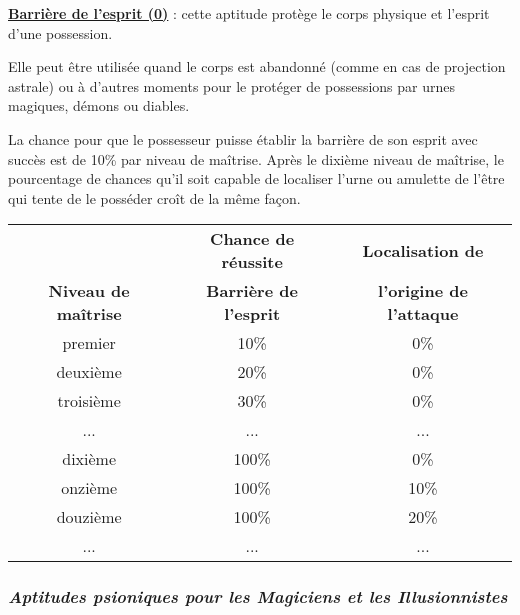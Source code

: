 \bigskip

\label{guerrier-barriere-esprit}\textbf{\uline{Barrière de l'esprit (0)}} : cette aptitude protège le corps physique et l'esprit d'une possession.

\bigskip

Elle peut être utilisée quand le corps est abandonné (comme en cas de projection astrale) ou à d'autres moments pour le protéger de possessions par urnes magiques, démons ou diables.

\bigskip

La chance pour que le possesseur puisse établir la barrière de son esprit avec succès est de 10\% par niveau de maîtrise. Après le dixième niveau de maîtrise, le pourcentage de chances qu'il soit capable de localiser l'urne ou amulette de l'être qui tente de le posséder croît de la même façon.

\bigskip

\begin{tabular}{ccc}
&\textbf{Chance de réussite} & \textbf{Localisation de} \\
\textbf{Niveau de maîtrise} & \textbf{Barrière de l'esprit} & \textbf{l'origine de l'attaque}\\
premier     & 10\%  & 0\% \\
deuxième    & 20\%  & 0\% \\
troisième   & 30\%  & 0\% \\
...         & ...   & ... \\
dixième     & 100\% & 0\% \\
onzième     & 100\% & 10\% \\
douzième    & 100\% & 20\% \\
...         & ...   & ... \\
\end{tabular}










\newpage
\subsubsection*{\textit{Aptitudes psioniques pour les Magiciens et les Illusionnistes}}

